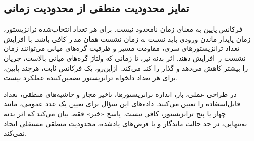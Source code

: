 \subsection*{تمایز محدودیت منطقی از محدودیت زمانی}
فرکانس پایین به معنای زمان نامحدود نیست.
برای هر تعداد انتخاب‌شده ترانزیستور، زمان پایدار ماندن ورودی باید نسبت به زمان نشست همان مدار کافی باشد.
با افزایش تعداد ترانزیستورهای سری، مقاومت مسیر و ظرفیت گره‌های میانی می‌توانند زمان نشست را افزایش دهند.
اثر بدنه نیز، تا زمانی که ولتاژ گره‌های میانی بالاست، جریان را بیشتر کاهش می‌دهد و گذار را کند می‌کند.
ازاین‌رو، یک فرکانس ثابت، هرچند پایین، برای هر تعداد دلخواه ترانزیستور تضمین‌کننده عملکرد نیست.

در طراحی عملی، بار، اندازه ترانزیستورها، تأخیر مجاز و حاشیه‌های منطقی، تعداد قابل‌استفاده را تعیین می‌کنند.
داده‌های این سؤال برای تعیین یک عدد عمومی، مانند چهار یا پنج ترانزیستور، کافی نیست.
پاسخ «خیر» فقط بیان می‌کند که اثر بدنه به‌تنهایی، در حد حالت ماندگار و با فرض‌های یادشده، محدودیت منطقی مستقلی ایجاد نمی‌کند.
